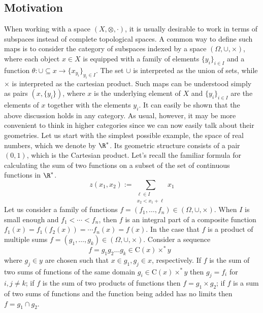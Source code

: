 \documentclass[a4paper,reqno,oneside]{article}
\begin{document}
\subsection*{Motivation} 
When working with a space $(X,\otimes,\cdot)$, it is usually desirable to work in terms of subspaces instead of complete topological spaces. A common way to define such maps is to consider the category of subspaces indexed by a space $(\Omega,\cup,\times)$, where each object $x\in X$ is equipped with a family of elements $\{y_i\}_{i\in I}$ and a function $\theta : \cup \subseteq x \to \{x_{y_i}\}_{y_i\in I}$. The set $\cup$ is interpreted as the union of sets, while $\times$ is interpreted as the cartesian product. Such maps can be understood simply as pairs $(x,\{y_i\})$, where $x$ is the underlying element of $X$ and $\{y_i\}_{i\in I}$ are the elements of $x$ together with the elements $y_i$.  It can easily be shown that the above discussion holds in any category. As usual, however, it may be more convenient to think in higher categories since we can now easily talk about their geometries. Let us start with the simplest possible example, the space of real numbers, which we denote by $\R^*$. Its geometric structure consists of a pair $(0,1)$, which is the Cartesian product. Let's recall the familiar formula for calculating the sum of two functions on a subset of the set of continuous functions in $\R^*$. 
\begin{equation*}
    z(x_1,x_2):=\sum_{\substack{\ell\in I\\ x_2<x_1+\ell}} x_1
\end{equation*}  
Let us consider a family of functions $f=(f_1,\ldots,f_n)\in (\Omega,\cup,\times)$. When $I$ is small enough and $f_1<\cdots<f_n$, then $f$ is an integral part of a composite function $f_1(x)=f_1(f_2(x))=\cdots f_n(x)=f(x).$ In the case that $f$ is a product of multiple sums $f=(g_1,\ldots,g_k)\in (\Omega,\cup,\times)$. Consider a sequence 
$$f = g_1g_2\ldots g_k \in \text{C}(x)\times^{\ast} y \text{ }$$
where $g_j\in y$ are chosen such that $x\in g_1,g_j\in x$, respectively. If $f$ is the sum of two sums of functions of the same domain $g_i\in \text{C}(x)\times^{\ast} y$ then $g_j=f_i$ for $i,j\neq k$; if $f$ is the sum of two products of functions then $f=g_1\times g_2$; if $f$ is a sum of two sums of functions and the function being added has no limits then $f=g_1\cap g_2$.  
\end{document}
